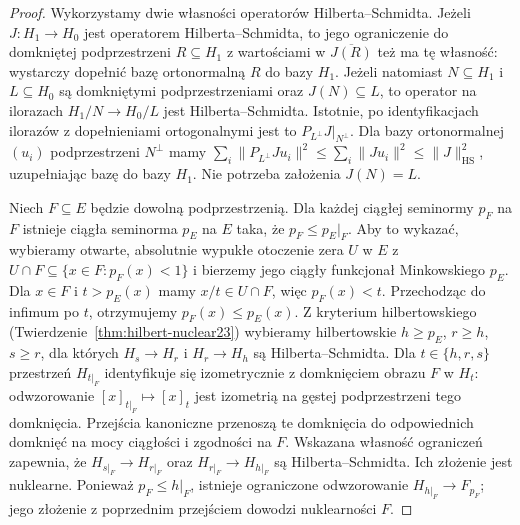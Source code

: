 \begin{proof}
Wykorzystamy dwie własności operatorów Hilberta--Schmidta.
Jeżeli $J:H_1\to H_0$ jest operatorem Hilberta--Schmidta,
to jego ograniczenie do domkniętej podprzestrzeni $R\subseteq H_1$
z wartościami w $\overline{J(R)}$ też ma tę własność:
wystarczy dopełnić bazę ortonormalną $R$ do bazy $H_1$.
Jeżeli natomiast $N\subseteq H_1$ i $L\subseteq H_0$
są domkniętymi podprzestrzeniami oraz $J(N)\subseteq L$,
to operator na ilorazach $H_1/N\to H_0/L$ jest
Hilberta--Schmidta. Istotnie, po identyfikacjach ilorazów
z dopełnieniami ortogonalnymi jest to
$P_{L^\perp}J|_{N^\perp}$.
Dla bazy ortonormalnej $(u_i)$ podprzestrzeni $N^\perp$
mamy $\sum_i\|P_{L^\perp}Ju_i\|^2\le\sum_i\|Ju_i\|^2
\le\|J\|_{\mathrm{HS}}^2$, uzupełniając bazę do bazy $H_1$.
Nie potrzeba założenia $J(N)=L$.

Niech $F\subseteq E$ będzie dowolną podprzestrzenią.
Dla każdej ciągłej seminormy $p_F$ na $F$ istnieje
ciągła seminorma $p_E$ na $E$ taka, że
$p_F\le p_E|_F$. Aby to wykazać, wybieramy otwarte, absolutnie
wypukłe otoczenie zera $U$ w $E$ z
$U\cap F\subseteq\{x\in F:p_F(x)<1\}$ i bierzemy
jego ciągły funkcjonał Minkowskiego $p_E$.
Dla $x\in F$ i $t>p_E(x)$ mamy $x/t\in U\cap F$,
więc $p_F(x)<t$. Przechodząc do infimum po $t$,
otrzymujemy $p_F(x)\le p_E(x)$. Z kryterium hilbertowskiego
(Twierdzenie~\ref{thm:hilbert-nuclear23}) wybieramy
hilbertowskie $h\ge p_E$, $r\ge h$, $s\ge r$,
dla których $H_s\to H_r$ i $H_r\to H_h$ są
Hilberta--Schmidta. Dla $t\in\{h,r,s\}$ przestrzeń
$H_{t|_F}$ identyfikuje się izometrycznie z domknięciem
obrazu $F$ w $H_t$: odwzorowanie $[x]_{t|_F}\mapsto[x]_t$
jest izometrią na gęstej podprzestrzeni tego domknięcia.
Przejścia kanoniczne przenoszą te domknięcia do
odpowiednich domknięć na mocy ciągłości i zgodności na $F$. Wskazana własność ograniczeń zapewnia,
że $H_{s|_F}\to H_{r|_F}$ oraz
$H_{r|_F}\to H_{h|_F}$ są Hilberta--Schmidta.
Ich złożenie jest nuklearne. Ponieważ
$p_F\le h|_F$, istnieje ograniczone odwzorowanie
$H_{h|_F}\to F_{p_F}$; jego złożenie z poprzednim
przejściem dowodzi nuklearności $F$.


\end{proof}
